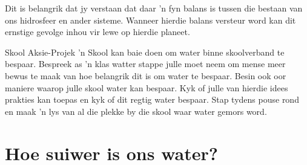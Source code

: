       \label{m38138*id342412}Dit is belangrik dat jy verstaan dat daar  'n fyn balans is tussen die bestaan van ons hidrosfeer en ander sisteme. Wanneer hierdie balans versteur word kan dit ernstige gevolge inhou vir lewe op hierdie planeet.
\label{m38138*secfhsst!!!underscore!!!id1065}
            \begin{project}{Skool Aksie-Projek
      }
            \nopagebreak
 'n Skool kan baie doen om water binne skoolverband te bespaar. Bespreek as  'n klas watter stappe julle moet neem om mense meer bewus te maak van hoe belangrik dit is om water te bespaar. Besin ook oor maniere waarop julle skool water kan bespaar. Kyk of julle van hierdie idees prakties kan toepas en kyk of dit regtig water bespaar. Stap tydens pouse rond en maak  'n lys van al die plekke by die skool waar water gemors word.
\end{project}

\section{Hoe suiwer is ons water?}
            \nopagebreak


